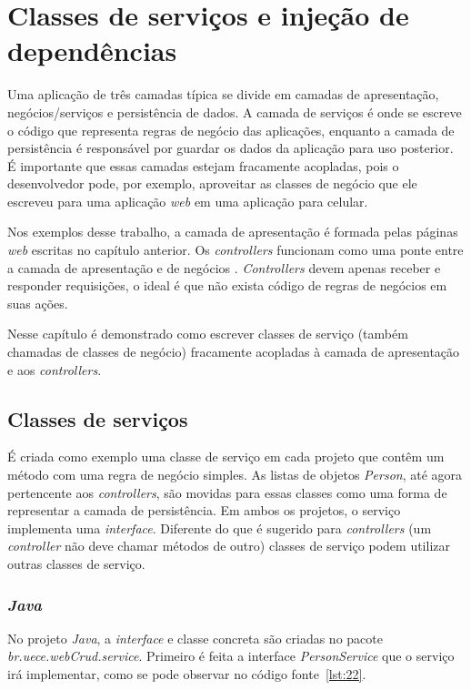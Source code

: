 \chapter{Classes de serviços e injeção de dependências}

Uma aplicação de três camadas típica se divide em camadas de apresentação, negócios/serviços e persistência de dados. A camada de serviços é onde se escreve o código que representa regras de negócio das aplicações, enquanto a camada de persistência é responsável por guardar os dados da aplicação para uso posterior. É importante que essas camadas estejam fracamente acopladas, pois o desenvolvedor pode, por exemplo, aproveitar as classes de negócio que ele escreveu para uma aplicação \textit{web} em uma aplicação para celular.

Nos exemplos desse trabalho, a camada de apresentação é formada pelas páginas \textit{web} escritas no capítulo anterior. Os \textit{controllers} funcionam como uma ponte entre a camada de apresentação e de negócios \cite{6}. \textit{Controllers} devem apenas receber e responder requisições, o ideal é que não exista código de regras de negócios em suas ações.

Nesse capítulo é demonstrado como escrever classes de serviço (também chamadas de classes de negócio) fracamente acopladas à camada de apresentação e aos \textit{controllers}. 

\section{Classes de serviços}

É criada como exemplo uma classe de serviço em cada projeto que contêm um método com uma regra de negócio simples. As listas de objetos \textit{Person}, até agora pertencente aos \textit{controllers}, são movidas para essas classes como uma forma de representar a camada de persistência. Em ambos os projetos, o serviço implementa uma \textit{interface}. Diferente do que é sugerido para \textit{controllers} (um \textit{controller} não deve chamar métodos de outro) classes de serviço podem utilizar outras classes de serviço.

\subsection{\textit{Java}}

No projeto \textit{Java}, a \textit{interface} e classe concreta são criadas no pacote \textit{br.uece.webCrud.service}. Primeiro é feita a interface \textit{PersonService} que o serviço irá implementar, como se pode observar no código fonte~\ref{lst:22}.

